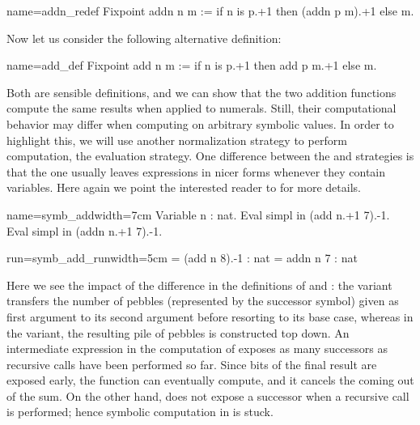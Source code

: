 \begin{coq}{name=addn_redef}{}
Fixpoint addn n m := if n is p.+1 then (addn p m).+1 else m.
\end{coq}

Now let us consider the following alternative definition:

\begin{coq}{name=add_def}{}
Fixpoint add n m := if n is p.+1 then add p m.+1 else m.
\end{coq}

Both are sensible definitions, and we can show that the two addition
functions compute the same results when applied to numerals.  Still,
their computational behavior may differ when computing on arbitrary
symbolic values. In order to highlight this, we will use another
normalization strategy to perform computation, the 
evaluation strategy.  One difference between the 
and  strategies is that the  one usually leaves
expressions in nicer forms whenever they contain variables. Here again
we point the interested reader to \cite[section 8.7.1]{Coq:manual} for
more details.

\begin{coq}{name=symb_add}{width=7cm}
Variable n : nat.
Eval simpl in (add  n.+1 7).-1.
Eval simpl in (addn n.+1 7).-1.
\end{coq}
\begin{coqout}{run=symb_add_run}{width=5cm}
= (add n 8).-1 : nat
= addn n 7 : nat
\end{coqout}

Here we see the impact of the difference in the definitions of
 and : the  variant transfers the
number of pebbles (represented by the successor  symbol)
given as first argument to its second argument
before resorting to its base case, whereas in the  variant,
the resulting pile of pebbles is constructed top down. An intermediate
expression in the computation of  exposes as many
successors as recursive calls have been performed so far. Since bits
of the final result are exposed early, the  function can
eventually compute, and it cancels the  coming out of the sum.
On the other hand,
 does not expose a successor when a recursive call is
performed; hence symbolic computation in  is stuck.

